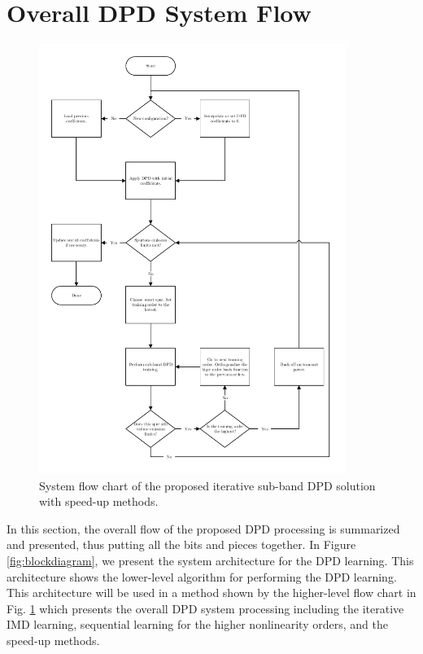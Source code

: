 \section{Overall DPD System Flow}
\label{sec:SystemFlow}
\begin{figure}
	\centering
	\centerline{\includegraphics[width=0.89\textwidth]{SubBandSystemNew.pdf}}
	\caption[]{System flow chart of the proposed iterative sub-band DPD solution with speed-up methods.}
	\label{fig:SystemFlowChart}
\end{figure}
In this section, the overall flow of the proposed DPD processing is summarized and presented, thus putting all the bits and pieces together. 
{\color{red}In Figure \ref{fig:blockdiagram}, we present the system architecture for the DPD learning. This architecture shows the lower-level algorithm for performing the DPD learning. This architecture will be used in a method shown by the higher-level flow chart in Fig. \ref{fig:SystemFlowChart} which presents the overall DPD system processing including the iterative IMD learning, sequential learning for the higher nonlinearity orders, and the speed-up methods.}

